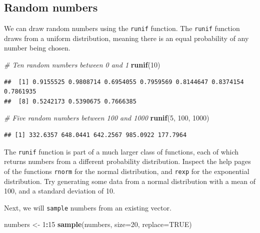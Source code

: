 \documentclass[]{book}
\newenvironment{Shaded}{\begin{snugshade}}{\end{snugshade}}
\newcommand{\CommentTok}[1]{\textcolor[rgb]{0.56,0.35,0.01}{\textit{#1}}}
\newcommand{\DataTypeTok}[1]{\textcolor[rgb]{0.13,0.29,0.53}{#1}}
\newcommand{\DecValTok}[1]{\textcolor[rgb]{0.00,0.00,0.81}{#1}}
\newcommand{\KeywordTok}[1]{\textcolor[rgb]{0.13,0.29,0.53}{\textbf{#1}}}
\newcommand{\NormalTok}[1]{#1}
\newcommand{\OperatorTok}[1]{\textcolor[rgb]{0.81,0.36,0.00}{\textbf{#1}}}
\newcommand{\OtherTok}[1]{\textcolor[rgb]{0.56,0.35,0.01}{#1}}
\newcommand{\StringTok}[1]{\textcolor[rgb]{0.31,0.60,0.02}{#1}}
\let\BeginKnitrBlock\begin \let\EndKnitrBlock\end
\begin{document}
\hypertarget{randomnumbers}{%
\subsection{Random numbers}\label{randomnumbers}}

We can draw random numbers using the \texttt{runif} function. The \texttt{runif} function draws from a uniform distribution, meaning there is an equal probability of any number being chosen.

\begin{Shaded}
\begin{Highlighting}[]
\CommentTok{# Ten random numbers between 0 and 1}
\KeywordTok{runif}\NormalTok{(}\DecValTok{10}\NormalTok{)}
\end{Highlighting}
\end{Shaded}

\begin{verbatim}
##  [1] 0.9155525 0.9808714 0.6954055 0.7959569 0.8144647 0.8374154 0.7861935
##  [8] 0.5242173 0.5390675 0.7666385
\end{verbatim}

\begin{Shaded}
\begin{Highlighting}[]
\CommentTok{# Five random numbers between 100 and 1000}
\KeywordTok{runif}\NormalTok{(}\DecValTok{5}\NormalTok{, }\DecValTok{100}\NormalTok{, }\DecValTok{1000}\NormalTok{)}
\end{Highlighting}
\end{Shaded}

\begin{verbatim}
## [1] 332.6357 648.0441 642.2567 985.0922 177.7964
\end{verbatim}

\BeginKnitrBlock{rmdtry}
The \texttt{runif} function is part of a much larger class of functions, each of which returns
numbers from a different probability distribution. Inspect the help pages of the functions \texttt{rnorm}
for the normal distribution, and \texttt{rexp} for the exponential distribution. Try generating some data from a normal distribution with a mean of 100, and a standard deviation of 10.
\EndKnitrBlock{rmdtry}

Next, we will \texttt{sample} numbers from an existing vector.

\begin{Shaded}
\begin{Highlighting}[]
\NormalTok{numbers <-}\StringTok{ }\DecValTok{1}\OperatorTok{:}\DecValTok{15}
\KeywordTok{sample}\NormalTok{(numbers, }\DataTypeTok{size=}\DecValTok{20}\NormalTok{, }\DataTypeTok{replace=}\OtherTok{TRUE}\NormalTok{)}
\end{Highlighting}
\end{Shaded}
\end{document}
